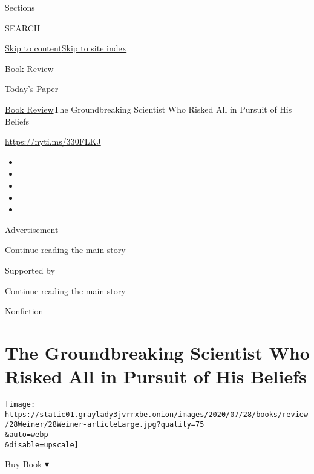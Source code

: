 Sections

SEARCH

\protect\hyperlink{site-content}{Skip to
content}\protect\hyperlink{site-index}{Skip to site index}

\href{https://www.nytimes3xbfgragh.onion/section/books/review}{Book
Review}

\href{https://myaccount.nytimes3xbfgragh.onion/auth/login?response_type=cookie\&client_id=vi}{}

\href{https://www.nytimes3xbfgragh.onion/section/todayspaper}{Today's
Paper}

\href{/section/books/review}{Book Review}\textbar{}The Groundbreaking
Scientist Who Risked All in Pursuit of His Beliefs

\url{https://nyti.ms/330FLKJ}

\begin{itemize}
\item
\item
\item
\item
\item
\end{itemize}

Advertisement

\protect\hyperlink{after-top}{Continue reading the main story}

Supported by

\protect\hyperlink{after-sponsor}{Continue reading the main story}

Nonfiction

\hypertarget{the-groundbreaking-scientist-who-risked-all-in-pursuit-of-his-beliefs}{%
\section{The Groundbreaking Scientist Who Risked All in Pursuit of His
Beliefs}\label{the-groundbreaking-scientist-who-risked-all-in-pursuit-of-his-beliefs}}

\texttt{[image: https://static01.graylady3jvrrxbe.onion/images/2020/07/28/books/review/28Weiner/28Weiner-articleLarge.jpg?quality=75\\\&auto=webp\\\&disable=upscale]}

Buy Book ▾

